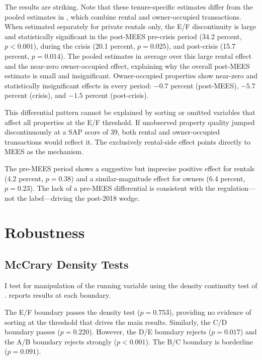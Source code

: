 \documentclass[12pt]{article}
\begin{document}
The results are striking. Note that these tenure-specific estimates differ from the pooled estimates in , which combine rental and owner-occupied transactions. When estimated separately for private rentals only, the E/F discontinuity is large and statistically significant in the post-MEES pre-crisis period (34.2 percent, $p < 0.001$), during the crisis (20.1 percent, $p = 0.025$), and post-crisis (15.7 percent, $p = 0.014$). The pooled estimates in  average over this large rental effect and the near-zero owner-occupied effect, explaining why the overall post-MEES estimate is small and insignificant. Owner-occupied properties show near-zero and statistically insignificant effects in every period: $-0.7$ percent (post-MEES), $-5.7$ percent (crisis), and $-1.5$ percent (post-crisis).

This differential pattern cannot be explained by sorting or omitted variables that affect all properties at the E/F threshold. If unobserved property quality jumped discontinuously at a SAP score of 39, both rental and owner-occupied transactions would reflect it. The exclusively rental-side effect points directly to MEES as the mechanism.

The pre-MEES period shows a suggestive but imprecise positive effect for rentals (4.2 percent, $p = 0.38$) and a similar-magnitude effect for owners (6.4 percent, $p = 0.23$). The lack of a pre-MEES differential is consistent with the regulation---not the label---driving the post-2018 wedge.


\section{Robustness}\label{sec:robustness}

\subsection{McCrary Density Tests}

I test for manipulation of the running variable using the density continuity test of \citet{cattaneo2020density}.  reports results at each boundary.



The E/F boundary passes the density test ($p = 0.753$), providing no evidence of sorting at the threshold that drives the main results. Similarly, the C/D boundary passes ($p = 0.220$). However, the D/E boundary rejects ($p = 0.017$) and the A/B boundary rejects strongly ($p < 0.001$). The B/C boundary is borderline ($p = 0.091$).
\end{document}
